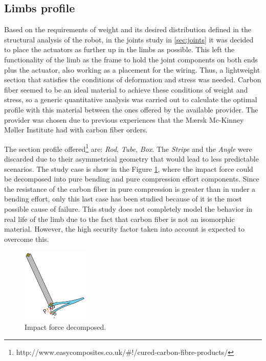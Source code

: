 \subsection{Limbs profile} %
\label{sub:limb_profile}
Based on the requirements of weight and its desired distribution defined in the structural analysis of the robot, in the joints study in \ref{sec:joints} it was decided to place the actuators as further up in the limbs as possible.
This left the functionality of the limb as the frame to hold the joint components on both ends plus the actuator, also working as a placement for the wiring.
Thus, a lightweight section that satisfies the conditions of deformation and stress was needed.
Carbon fiber seemed to be an ideal material to achieve these conditions of weight and stress, so a generic quantitative analysis was carried out to calculate the optimal profile with this material between the ones offered by the available provider.
The provider was chosen due to previous experiences that the Mærsk Mc-Kinney Møller Institute had with carbon fiber orders.

The section profile offered\footnote{http://www.easycomposites.co.uk/\#!/cured-carbon-fibre-products/} are: \textit{Rod}, \textit{Tube}, \textit{Box}. The \textit{Stripe} and the \textit{Angle} were discarded due to their asymmetrical geometry that would lead to less predictable scenarios.
The study case is show in the Figure \ref{fig:impact_decomposition}, where the impact force could be decomposed into pure bending and pure compression effort components.
Since the resistance of the carbon fiber in pure compression is greater than in under a bending effort, only this last case has been studied because of it is the most possible cause of failure.
This study does not completely model the behavior in real life of the limb due to the fact that carbon fiber is not an isomorphic material.
However, the high security factor taken into account is expected to overcome this.

\begin{figure}[ht!]
  \centering
  \includegraphics[width=.3\textwidth]{figures/impact_decomposition.pdf}
  \caption{Impact force decomposed.}
  \label{fig:impact_decomposition}
\end{figure}

